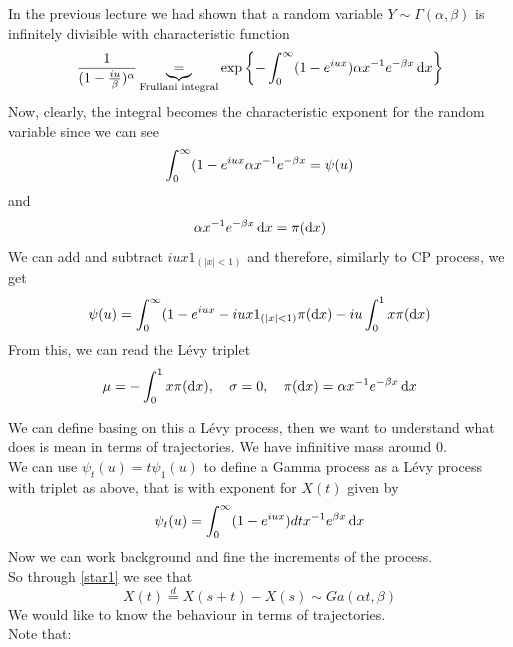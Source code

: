 \documentclass[class=article,crop=false]{standalone}
\begin{document}
\begin{example}
	In the previous lecture we had shown that a random variable $Y \sim \Gamma(\alpha, \beta)$ is infinitely divisible with characteristic function 
	\begin{equation}
		\label{star1}
		\frac{1}{(1-\frac{iu}{\beta})^\alpha} \underbrace{=}_{\text{Frullani integral}}\exp\left\{-\int_0^\infty(1-e^{iux})\alpha x^{-1} e^{-\beta x}\mathop{}\!\mathrm{d} x\right\}
	\end{equation}
	Now, clearly, the integral becomes the characteristic exponent for the random variable since we can see
	\begin{equation*}
		\int_0^\infty(1-e^{iux}\alpha x^{-1} e^{-\beta x} = \psi(u)
	\end{equation*}
	and 
	\begin{equation*}
		\alpha x^{-1} e^{-\beta x}\mathop{}\!\mathrm{d} x = \pi(\mathop{}\!\mathrm{d} x)
	\end{equation*}
	We can add and subtract $iux 1_{(|x|<1)}$ and therefore, similarly to CP process, we get 
	\begin{equation*}
		\psi(u) = \int_0^\infty (1-e^{iux} - iux 1_{(|x|<1)}\pi(\mathop{}\!\mathrm{d} x) - iu \int_0^1x \pi(\mathop{}\!\mathrm{d} x)
	\end{equation*}
	From this, we can read the L\'evy triplet 
	\begin{equation*}
		\mu = - \int_0^1x \pi(\mathop{}\!\mathrm{d} x),  \quad \sigma = 0, \quad \pi(\mathop{}\!\mathrm{d} x) = \alpha x^{-1} e^{-\beta x}\mathop{}\!\mathrm{d} x
	\end{equation*}
\end{example}
We can define basing on this a L\'evy process, then we want to understand what does is mean in terms of trajectories. We have infinitive mass around 0.  \\
We can use $\psi_t(u) = t \psi_1(u)$  to define a Gamma process as a L\'evy process with triplet as above, that is with exponent for $X(t)$ given by
\begin{equation*}
	\psi_t(u) = \int_0^\infty (1-e^{iux})dt x^{-1}e^{\beta x}\mathop{}\!\mathrm{d} x
\end{equation*}
Now we can work background and fine the increments of the process. \\
So through \eqref{star1} we see that 
\begin{equation*}
	X(t) \stackrel{d}= X(s+t) - X(s) \sim Ga(\alpha t, \beta)
\end{equation*}
We would like to know the behaviour in terms of trajectories. \\
Note that:
\end{document}
